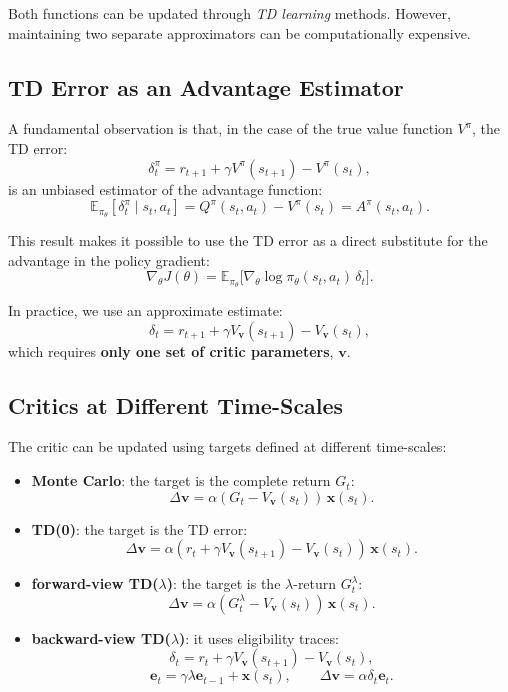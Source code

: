 Both functions can be updated through \emph{TD learning} methods. However, maintaining two separate approximators can be computationally expensive.

\subsection{TD Error as an Advantage Estimator}

A fundamental observation is that, in the case of the true value function $V^\pi$, the TD error:
\[
\delta_t^\pi
= r_{t+1} + \gamma V^\pi(s_{t+1}) - V^\pi(s_t),
\]
is an unbiased estimator of the advantage function:
\[
\mathbb{E}_{\pi_\theta}[\delta_t^\pi \mid s_t, a_t]
= Q^\pi(s_t,a_t) - V^\pi(s_t)
= A^\pi(s_t,a_t).
\]

This result makes it possible to use the TD error as a direct substitute for the advantage in the policy gradient:
\[
\nabla_\theta J(\theta)
= \mathbb{E}_{\pi_\theta}
\big[
\nabla_\theta \log \pi_\theta(s_t,a_t)\, \delta_t
\big].
\]

In practice, we use an approximate estimate:
\[
\delta_t
= r_{t+1}
+ \gamma V_{\mathbf{v}}(s_{t+1})
- V_{\mathbf{v}}(s_t),
\]
which requires \textbf{only one set of critic parameters}, $\mathbf{v}$.

\subsection{Critics at Different Time-Scales}

The critic can be updated using targets defined at different time-scales:
\begin{itemize}
    \item \textbf{Monte Carlo}: the target is the complete return $G_t$:
    \[
    \Delta \mathbf{v}
    = \alpha (G_t - V_{\mathbf{v}}(s_t))\, \mathbf{x}(s_t).
    \]
    \item \textbf{TD(0)}: the target is the TD error:
    \[
    \Delta \mathbf{v}
    = \alpha (r_t + \gamma V_{\mathbf{v}}(s_{t+1}) - V_{\mathbf{v}}(s_t))\, \mathbf{x}(s_t).
    \]
    \item \textbf{forward-view TD($\lambda$)}: the target is the $\lambda$-return $G_t^\lambda$:
    \[
    \Delta \mathbf{v}
    = \alpha (G_t^\lambda - V_{\mathbf{v}}(s_t))\, \mathbf{x}(s_t).
    \]
    \item \textbf{backward-view TD($\lambda$)}: it uses eligibility traces:
    \[
    \delta_t = r_t + \gamma V_{\mathbf{v}}(s_{t+1}) - V_{\mathbf{v}}(s_t),
    \]
    \[
    \mathbf{e}_t = \gamma \lambda \mathbf{e}_{t-1} + \mathbf{x}(s_t),
    \qquad
    \Delta \mathbf{v} = \alpha \delta_t \mathbf{e}_t.
    \]
\end{itemize}

